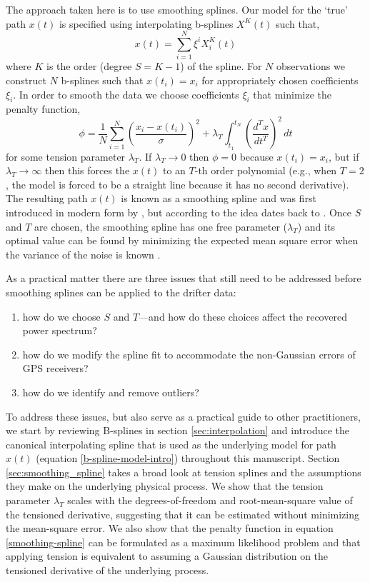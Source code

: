 \documentclass[10pt,journal]{IEEEtran}
\begin{document}
The approach taken here is to use smoothing splines. Our model for the `true' path $x(t)$ is specified using interpolating b-splines $X^K(t)$ such that,
\begin{equation}
\label{b-spline-model-intro}
    x(t) = \sum_{i=1}^N \xi^i X^K_i(t)
\end{equation}
where $K$ is the order (degree $S=K-1$) of the spline. For $N$ observations we construct $N$ b-splines such that $x(t_i)=x_i$ for appropriately chosen coefficients $\xi_i$. In order to smooth the data we choose coefficients $\xi_i$ that minimize the penalty function,
\begin{equation}
\label{smoothing-spline}
\phi =  \frac{1}{N}\sum_{i=1}^{N} \left( \frac{x_i - x(t_i)}{\sigma} \right) ^2 + \lambda_T \int_{t_1}^{t_N} \left(\frac{d^T x}{dt^T}\right)^2 \, dt
\end{equation}
for some tension parameter $\lambda_T$. If $\lambda_T \rightarrow 0$ then $\phi=0$ because $x(t_i)=x_i$, but if $\lambda_T \rightarrow \infty$ then this forces the $x(t)$ to an $T$-th order polynomial (e.g., when $T=2$, the model is forced to be a straight line because it has no second derivative). The resulting path $x(t)$ is known as a smoothing spline and was first introduced in modern form by \cite{reinsch1967-nm}, but according to \cite{deboor1978-book} the idea dates back to \cite{whittaker1923-pems}. Once $S$ and $T$ are chosen, the smoothing spline has one free parameter ($\lambda_T$) and its optimal value can be found by minimizing the expected mean square error when the variance of the noise is known \cite{craven1979-nm}.

As a practical matter there are three issues that still need to be addressed before smoothing splines can be applied to the drifter data:
\begin{enumerate}
    \item how do we choose $S$ and $T$---and how do these choices affect the recovered power spectrum?
    \item how do we modify the spline fit to accommodate the non-Gaussian errors of GPS receivers?
    \item how do we identify and remove outliers?
\end{enumerate}
To address these issues, but also serve as a practical guide to other practitioners, we start by reviewing B-splines in section \ref{sec:interpolation} and introduce the canonical interpolating spline that is used as the underlying model for path $x(t)$ (equation \ref{b-spline-model-intro}) throughout this manuscript. Section \ref{sec:smoothing_spline} takes a broad look at tension splines and the assumptions they make on the underlying physical process. We show that the tension parameter $\lambda_T$ scales with the degrees-of-freedom and root-mean-square value of the tensioned derivative, suggesting that it can be estimated without minimizing the mean-square error. We also show that the penalty function in equation \ref{smoothing-spline} can be formulated as a maximum likelihood problem and that applying tension is equivalent to assuming a Gaussian distribution on the tensioned derivative of the underlying process.
\end{document}
